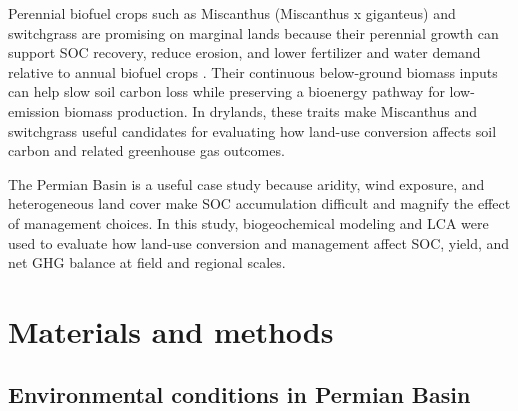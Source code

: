 \documentclass[11pt]{article}
\begin{document}
Perennial biofuel crops such as Miscanthus (Miscanthus x giganteus) and switchgrass are promising on marginal lands because their perennial growth can support SOC recovery, reduce erosion, and lower fertilizer and water demand relative to annual biofuel crops \citep{Davis2009Placeholder,Zeri2013WUE,AndersonTeixeira2009SOC,Ferrarini2022Placeholder}. Their continuous below-ground biomass inputs can help slow soil carbon loss while preserving a bioenergy pathway for low-emission biomass production. In drylands, these traits make Miscanthus and switchgrass useful candidates for evaluating how land-use conversion affects soil carbon and related greenhouse gas outcomes.

The Permian Basin is a useful case study because aridity, wind exposure, and heterogeneous land cover make SOC accumulation difficult and magnify the effect of management choices. In this study, biogeochemical modeling and LCA were used to evaluate how land-use conversion and management affect SOC, yield, and net GHG balance at field and regional scales.

\section*{Materials and methods}

\subsection*{Environmental conditions in Permian Basin}
\end{document}
